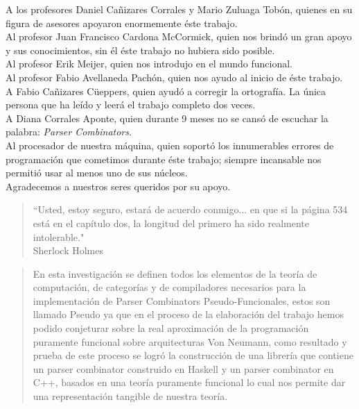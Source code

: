 \begin{acknowledgments}
A los profesores Daniel Cañizares Corrales y Mario Zuluaga Tobón, quienes en su figura de asesores apoyaron enormemente éste trabajo.\\
Al profesor Juan Francisco Cardona McCormick, quien nos brindó un gran apoyo y sus conocimientos, sin él éste trabajo no hubiera sido posible.\\
Al profesor Erik Meijer, quien nos introdujo en el mundo funcional.\\
Al profesor Fabio Avellaneda Pachón, quien nos ayudo al inicio de éste trabajo.\\
A Fabio Cañizares Cüeppers, quien ayudó a corregir la ortografía. La única persona que ha leído y leerá el trabajo completo dos veces.\\
A Diana Corrales Aponte, quien durante 9 meses no se cansó de escuchar la palabra: \emph{Parser Combinators}.\\
Al procesador de nuestra máquina, quien soportó los innumerables errores de programación que cometimos durante éste trabajo; siempre incansable nos permitió usar al menos uno de sus núcleos.\\



Agradecemos a nuestros seres queridos por su apoyo.\\
\vspace*{5cm}
\begin{quote}
	\hsp
	\em
	\raggedleft
	
	``Usted, estoy seguro, estará de acuerdo conmigo... en que si la página 534 está en el capítulo dos, la longitud del primero ha sido realmente intolerable."\\ Sherlock Holmes
	
\end{quote}

\end{acknowledgments}

\tableofcontents

\newpage

\begin{abstract}
\vspace{1cm}
En esta investigación se definen todos los elementos de la teoría de computación, de categorías y de compiladores necesarios para la implementación de Parser Combinators Pseudo-Funcionales, estos son llamado Pseudo ya que en el proceso de la elaboración del trabajo hemos podido conjeturar sobre la real aproximación de la programación puramente funcional sobre arquitecturas Von Neumann, como resultado y prueba de este proceso se logró la construcción de una librería que contiene un parser combinator construido en Haskell y un parser combinator en C++, basados en una teoría puramente funcional lo cual nos permite dar una representación tangible de nuestra teoría.
\end{abstract}

\startarabicpagination


